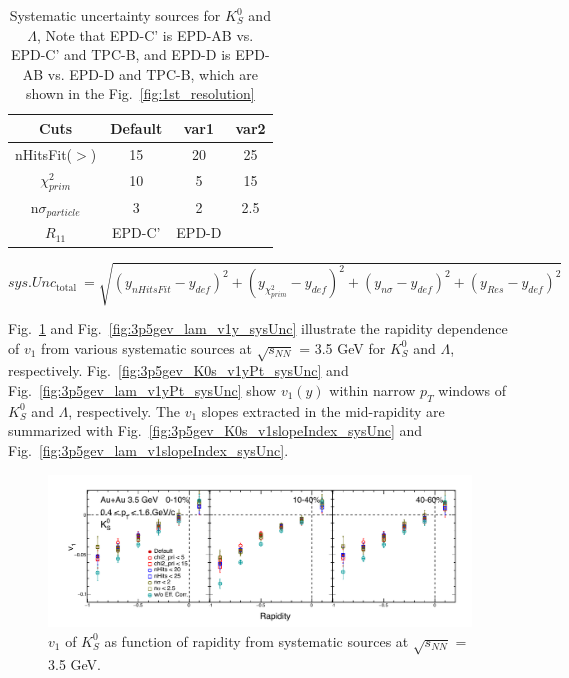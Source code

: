 \begin{table}
    \centering
    \begin{tabular}{|c|c|c|c|} \hline  
         Cuts&  Default&  var1& var2\\ \hline  
         nHitsFit($>$)&  15&  20& 25\\
 $\chi^2_{prim}$& 10& 5&15\\\hline  
         n$\sigma_{particle}$&  3&  2& 2.5\\ \hline 
         $R_{11}$&  EPD-C'&  EPD-D& \\ \hline 
    \end{tabular}
    \caption{Systematic uncertainty sources for $K^0_S$ and $\Lambda$, Note that EPD-C' is EPD-AB vs. EPD-C' and TPC-B, and EPD-D is EPD-AB vs. EPD-D and TPC-B,
    which are shown in the Fig.~\ref{fig:1st_resolution}}
    \label{tab:lamK0s_sysUnc}
\end{table}

\begin{equation}
s y s. Unc_{\text {total }}=\sqrt{\left(y_{n H i tsFit}-y_{d e f}\right)^2+\left(y_{\chi^2_{prim}}-y_{d e f}\right)^2+\left(y_{n \sigma}-y_{d e f}\right)^2+\left(y_{Res}-y_{d e f}\right)^2}
\label{eq:sysUnc_lamK0s}
\end{equation}

Fig.~\ref{fig:3p5gev_K0s_v1y_sysUnc} and Fig.~\ref{fig:3p5gev_lam_v1y_sysUnc} 
illustrate the rapidity dependence of $v_1$ from various systematic sources at $\sqrt{s_{NN}}$ = 3.5 GeV for $K^0_S$ and $\Lambda$, respectively.
Fig.~\ref{fig:3p5gev_K0s_v1yPt_sysUnc} and Fig.~\ref{fig:3p5gev_lam_v1yPt_sysUnc} show $v_1(y)$ within narrow $p_T$ windows of $K^0_S$ and $\Lambda$, respectively. 
The $v_1$ slopes extracted in the mid-rapidity are summarized with Fig.~\ref{fig:3p5gev_K0s_v1slopeIndex_sysUnc} and Fig.~\ref{fig:3p5gev_lam_v1slopeIndex_sysUnc}.


\begin{figure}[hbt!]
\centering
\includegraphics[width=0.95\linewidth]{figures/chapter03/3p5gev_K0s_v1y_sysUnc.pdf}
\caption{$v_1$ of $K^0_S$ as function of rapidity from systematic sources at $\sqrt{s_{NN}}$ = 3.5 GeV.}
\label{fig:3p5gev_K0s_v1y_sysUnc}
\end{figure}

